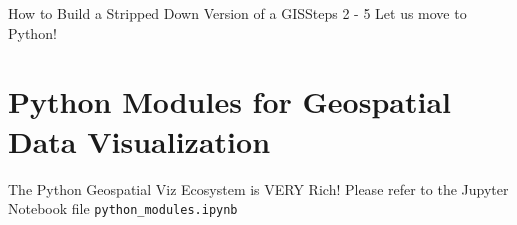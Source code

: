 \documentclass[notes, aspectratio=1610]{beamer}
\begin{document}
\begin{frame}{How to Build a Stripped Down Version of a GIS}{Steps 2 - 5}
\centering
\Large
Let us move to Python!
\end{frame}

\section{Python Modules for Geospatial Data Visualization}

\begin{frame}{The Python Geospatial Viz Ecosystem is VERY Rich!}{}
	\centering 
	\Large
	Please refer to the Jupyter Notebook file \texttt{python\_modules.ipynb}
\end{frame}


\end{document}
